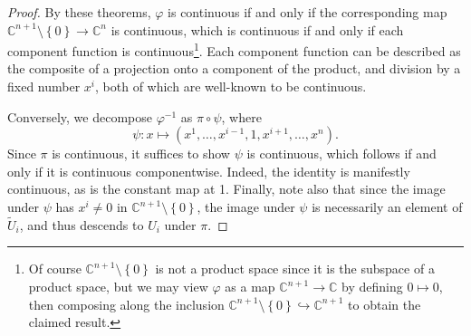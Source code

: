 \documentclass[11pt, letterpaper]{article}
\theoremstyle{theorem}
\begin{document}
\begin{proof}
	By these theorems, $\varphi $ is continuous if and only if the corresponding map $\mathbb{C} ^{n+1}\setminus \left\{ 0 \right\} \to \mathbb{C} ^n$ is continuous, which is continuous if and only if each component function is continuous\footnote{Of course $\mathbb{C} ^{n+1} \setminus \left\{ 0 \right\} $ is not a product space since it is the subspace of a product space, but we may view $\varphi $ as a map $\mathbb{C} ^{n+1} \to \mathbb{C} $ by defining $0\mapsto 0$, then composing along the inclusion $\mathbb{C} ^{n+1} \setminus \left\{ 0 \right\} \hookrightarrow \mathbb{C} ^{n+1} $ to obtain the claimed result.}. Each component function can be described as the composite of a projection onto a component of the product, and division by a fixed number $x^i$, both of which are well-known to be continuous.

	Conversely, we decompose $\varphi ^{-1} $ as $\pi \circ \psi $, where
	\[
		\psi : x \mapsto (x^1, \ldots ,x^{i-1} ,1,x^{i+1} ,\ldots ,x^n)
	.\]
	Since $\pi $ is continuous, it suffices to show $\psi $ is continuous, which follows if and only if it is continuous componentwise. Indeed, the identity is manifestly continuous, as is the constant map at 1. Finally, note also that since the image under $\psi $ has $x^i\neq 0$ in $\mathbb{C} ^{n+1}\setminus \left\{ 0 \right\} $, the image under $\psi $ is necessarily an element of $\widetilde{U} _i$, and thus descends to $U_i$ under $\pi $.


\end{proof}
\end{document}
